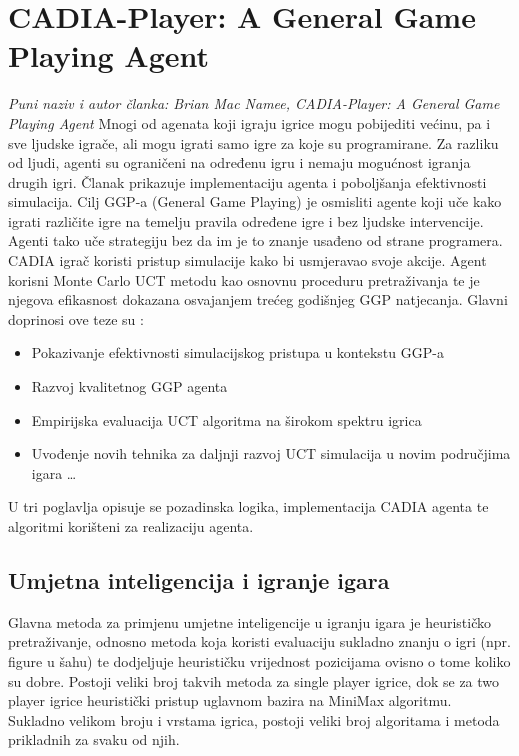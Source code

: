 \documentclass[a4paper,12pt]{foi}
\begin{document}
\section{CADIA-Player: A General Game Playing Agent}
\emph{Puni naziv i autor članka: Brian Mac Namee, CADIA-Player: A General Game Playing Agent} \citep{FinnsonH2007}
\newline
Mnogi od agenata koji igraju igrice mogu pobijediti većinu, pa i sve ljudske igrače, ali mogu igrati samo igre za koje su programirane. Za razliku od ljudi, agenti su ograničeni na određenu igru i nemaju mogućnost igranja drugih igri. Članak prikazuje implementaciju agenta i poboljšanja efektivnosti simulacija.
Cilj GGP-a (General Game Playing) je osmisliti agente koji uče kako igrati različite igre na temelju pravila određene igre i bez ljudske intervencije. Agenti tako uče strategiju bez da im je to znanje usađeno od strane programera. CADIA igrač koristi pristup simulacije kako bi usmjeravao svoje akcije. Agent korisni Monte Carlo UCT metodu kao osnovnu proceduru pretraživanja te je njegova efikasnost dokazana osvajanjem trećeg godišnjeg GGP natjecanja.
Glavni doprinosi ove teze su \citep{FinnsonH2007}:
\begin{itemize}
  \item Pokazivanje efektivnosti simulacijskog pristupa u kontekstu GGP-a
  \item Razvoj kvalitetnog GGP agenta
  \item Empirijska evaluacija UCT algoritma na širokom spektru igrica
  \item Uvođenje novih tehnika za daljnji razvoj UCT simulacija u novim područjima igara 
   \ldots
\end{itemize}


U tri poglavlja opisuje se pozadinska logika, implementacija CADIA  agenta te algoritmi korišteni za realizaciju agenta.

\subsection{Umjetna inteligencija i igranje igara}
Glavna metoda za primjenu umjetne inteligencije u igranju igara je heurističko pretraživanje, odnosno metoda koja koristi evaluaciju sukladno znanju o igri (npr. figure u šahu) te dodjeljuje heurističku vrijednost pozicijama ovisno o tome koliko su dobre. Postoji veliki broj takvih metoda za single player igrice, dok se za two player igrice heuristički pristup uglavnom bazira na MiniMax algoritmu. Sukladno velikom broju i vrstama igrica, postoji veliki broj algoritama i metoda prikladnih za svaku od njih.
\end{document}

